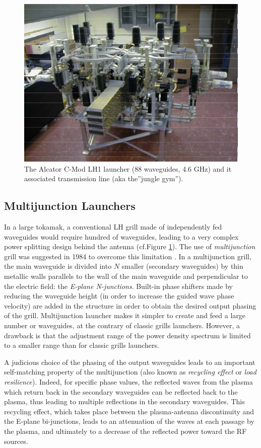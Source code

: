 \begin{figure}
\centering
\includegraphics[width=0.7\linewidth]{Figures/LHCD/CMod_LH1}
\caption{The Alcator C-Mod LH1 launcher (88 waveguides, 4.6 GHz) and it associated transmission line (aka the”jungle gym”).}
\label{fig:cmodlh1}
\end{figure}

\subsection{Multijunction Launchers}
In a large tokamak, a conventional LH grill made of independently fed waveguides would require hundred of waveguides, leading to a very complex power splitting design behind the antenna (cf.Figure \ref{fig:cmodlh1}). The use of \emph{multijunction} grill was suggested in 1984 to overcome this limitation \parencite{Gormezano1985, Moreau1984}. In a multijunction grill, the main waveguide is divided into $N$ smaller (secondary waveguides) by thin metallic walls parallels to the wall of the main waveguide and perpendicular to the electric field: the \emph{E-plane N-junctions}. Built-in phase shifters made by reducing the waveguide height (in order to increase the guided wave phase velocity) are added in the structure in order to obtain the desired output phasing of the grill. Multijunction launcher makes it simpler to create and feed a large number or waveguides, at the contrary of classic grills launchers. However, a drawback is that the adjustment range of the power density spectrum is limited to a smaller range than for classic grills launchers.

A judicious choice of the phasing of the output waveguides leads to an important self-matching property of the multijunction (also known as \emph{recycling effect} or \emph{load resilience}). Indeed, for specific phase values, the reflected waves from the plasma which return back in the secondary waveguides can be reflected back to the plasma, thus leading to multiple reflections in the secondary waveguides. This recycling effect, which takes place between the plasma-antenna discontinuity and the E-plane bi-junctions, leads to an attenuation of the waves at each passage by the plasma, and ultimately to a decrease of the reflected power toward the RF sources. 

